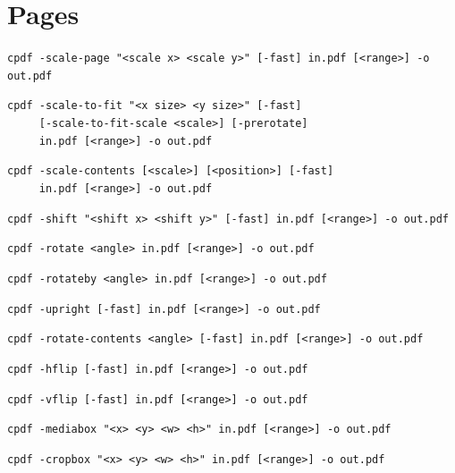 \documentclass{book}
\begin{document}
\chapter{Pages}\label{chap:3}
\pagestyle{fancy}
  \label{pages}
  \begin{framed}
  \small\noindent\verb!cpdf -scale-page "<scale x> <scale y>" [-fast] in.pdf [<range>] -o out.pdf!
   
  \vspace{1.5mm}
  \small\noindent\verb!cpdf -scale-to-fit "<x size> <y size>" [-fast]!\\
        \noindent\verb!     [-scale-to-fit-scale <scale>] [-prerotate]!\\    
        \noindent\verb!     in.pdf [<range>] -o out.pdf!

  \vspace{1.5mm}
  \small\noindent\verb!cpdf -scale-contents [<scale>] [<position>] [-fast]!\\
        \noindent\verb!     in.pdf [<range>] -o out.pdf!
  
  \vspace{1.5mm}
  \small\noindent\verb!cpdf -shift "<shift x> <shift y>" [-fast] in.pdf [<range>] -o out.pdf!

  \vspace{1.5mm}
  \small\noindent\verb!cpdf -rotate <angle> in.pdf [<range>] -o out.pdf!

  \vspace{1.5mm}
  \small\noindent\verb!cpdf -rotateby <angle> in.pdf [<range>] -o out.pdf!

  \vspace{1.5mm}
  \small\noindent\verb!cpdf -upright [-fast] in.pdf [<range>] -o out.pdf!

  \vspace{1.5mm}
  \small\noindent\verb!cpdf -rotate-contents <angle> [-fast] in.pdf [<range>] -o out.pdf!


  \vspace{1.5mm}
  \small\noindent\verb!cpdf -hflip [-fast] in.pdf [<range>] -o out.pdf!

  \vspace{1.5mm}
  \small\noindent\verb!cpdf -vflip [-fast] in.pdf [<range>] -o out.pdf!
  
  \vspace{1.5mm}
  \small\noindent\verb!cpdf -mediabox "<x> <y> <w> <h>" in.pdf [<range>] -o out.pdf!


  \vspace{1.5mm}
  \small\noindent\verb!cpdf -cropbox "<x> <y> <w> <h>" in.pdf [<range>] -o out.pdf!


\end{framed}
\end{document}
